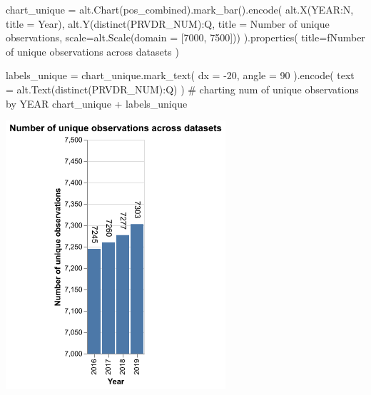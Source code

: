 \documentclass[
  letterpaper,
  DIV=11,
  numbers=noendperiod]{scrartcl}
\newenvironment{Shaded}{\begin{snugshade}}{\end{snugshade}}
\newcommand{\CommentTok}[1]{\textcolor[rgb]{0.37,0.37,0.37}{#1}}
\newcommand{\DecValTok}[1]{\textcolor[rgb]{0.68,0.00,0.00}{#1}}
\newcommand{\NormalTok}[1]{\textcolor[rgb]{0.00,0.23,0.31}{#1}}
\newcommand{\OperatorTok}[1]{\textcolor[rgb]{0.37,0.37,0.37}{#1}}
\newcommand{\SpecialStringTok}[1]{\textcolor[rgb]{0.13,0.47,0.30}{#1}}
\newcommand{\StringTok}[1]{\textcolor[rgb]{0.13,0.47,0.30}{#1}}
\begin{document}
\begin{Shaded}
\begin{Highlighting}[]
\NormalTok{chart\_unique }\OperatorTok{=}\NormalTok{ alt.Chart(pos\_combined).mark\_bar().encode(}
\NormalTok{    alt.X(}\StringTok{\textquotesingle{}YEAR:N\textquotesingle{}}\NormalTok{, title }\OperatorTok{=} \StringTok{\textquotesingle{}Year\textquotesingle{}}\NormalTok{),}
\NormalTok{    alt.Y(}\StringTok{\textquotesingle{}distinct(PRVDR\_NUM):Q\textquotesingle{}}\NormalTok{, title }\OperatorTok{=} \StringTok{\textquotesingle{}Number of unique observations\textquotesingle{}}\NormalTok{, scale}\OperatorTok{=}\NormalTok{alt.Scale(domain }\OperatorTok{=}\NormalTok{ [}\DecValTok{7000}\NormalTok{, }\DecValTok{7500}\NormalTok{]))}
\NormalTok{).properties(}
\NormalTok{        title}\OperatorTok{=}\SpecialStringTok{f\textquotesingle{}Number of unique observations across datasets\textquotesingle{}}
\NormalTok{    )}

\NormalTok{labels\_unique }\OperatorTok{=}\NormalTok{ chart\_unique.mark\_text(}
\NormalTok{    dx }\OperatorTok{=} \OperatorTok{{-}}\DecValTok{20}\NormalTok{,}
\NormalTok{    angle }\OperatorTok{=} \DecValTok{90}
\NormalTok{).encode(}
\NormalTok{    text }\OperatorTok{=}\NormalTok{ alt.Text(}\StringTok{\textquotesingle{}distinct(PRVDR\_NUM):Q\textquotesingle{}}\NormalTok{)}
\NormalTok{)  }\CommentTok{\# charting num of unique observations by YEAR}
\NormalTok{chart\_unique }\OperatorTok{+}\NormalTok{ labels\_unique}
\end{Highlighting}
\end{Shaded}

\includegraphics[width=3.20833in,height=3.92708in]{pset4_template_files/figure-pdf/cell-5-output-1.png}
\end{document}
